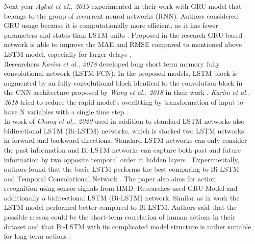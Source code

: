 Next year \textit{Aykut et al., 2019} experimented in their work \cite{telepresence} with GRU model that belongs to the group of recurrent neural networks (RNN). Authors considered GRU usage because it is computationally more efficient, as it has fewer parameters and states than LSTM units \cite{telepresence}. Proposed in the research GRU-based network is able to improve the MAE and RMSE compared to mentioned above LSTM model, especially for larger delays \cite{telepresence}. \\
Researchers \textit{Karim et al., 2018} developed long short term memory fully convolutional network (LSTM-FCN). In the proposed models, LSTM block is augmented by an fully convolutional block \cite{lstm_fcn} identical to the convolution block in the CNN architecture proposed by \textit{Wang et al., 2018} in their work \cite{timeseries_scratch}. \textit{Karim et al., 2018} tried to reduce the rapid model's overfitting by transformation of input to have N variables with a single time step \cite{lstm_fcn}.\\
In work of \textit{Chang et al., 2020} used in addition to standard LSTM networks also bidirectional LSTM (Bi-LSTM) networks, which is stacked two LSTM networks in forward and backward directions. Standard LSTM networks can only consider the past information and Bi-LSTM networks can capture both past and future information by two opposite temporal order in hidden layers \cite{6DoF_Tracking}. Experimentally, authors found that the basic LSTM performs the best comparing to Bi-LSTM and Temporal Convolutional Network  \cite{6DoF_Tracking}.
The paper \cite{action_recognition} also aims for action recognition using sensor signals from HMD. Researches used GRU Model and additionally a bidirectional LSTM (Bi-LSTM) network. Similar as in work \cite{6DoF_Tracking} the LSTM model performed better compared to Bi-LSTM. Authors said that the possible reason could be the short-term correlation of human actions in their dataset and that Bi-LSTM with its complicated model structure is rather suitable for long-term actions \cite{action_recognition}.\\
